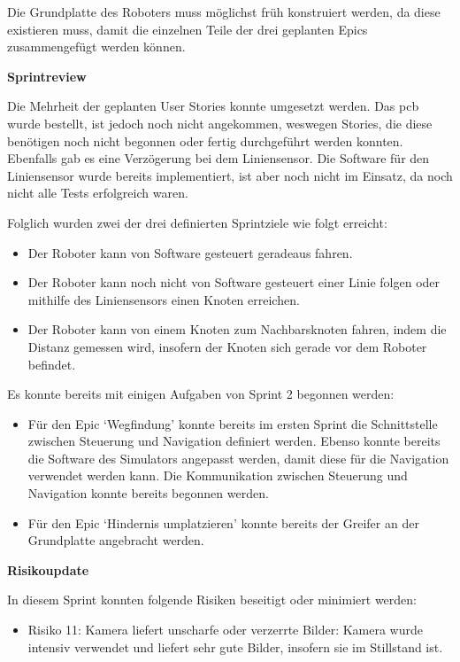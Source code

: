 Die Grundplatte des Roboters muss möglichst früh konstruiert werden, da diese existieren muss, damit die einzelnen Teile der drei geplanten Epics zusammengefügt werden können.


\textbf{Sprintreview}

Die Mehrheit der geplanten User Stories konnte umgesetzt werden.
Das \acrshort{pcb} wurde bestellt, ist jedoch noch nicht angekommen, weswegen Stories, die diese benötigen noch nicht begonnen oder fertig durchgeführt werden konnten.
Ebenfalls gab es eine Verzögerung bei dem Liniensensor. Die Software für den Liniensensor wurde bereits implementiert, ist aber noch nicht im Einsatz, da noch nicht alle Tests erfolgreich waren.

Folglich wurden zwei der drei definierten Sprintziele wie folgt erreicht:
\begin{itemize}
    \item Der Roboter kann von Software gesteuert geradeaus fahren.
    \item Der Roboter kann noch nicht von Software gesteuert einer Linie folgen oder mithilfe des Liniensensors einen Knoten erreichen.
    \item Der Roboter kann von einem Knoten zum Nachbarsknoten fahren, indem die Distanz gemessen wird, insofern der Knoten sich gerade vor dem Roboter befindet.
\end{itemize}


Es konnte bereits mit einigen Aufgaben von Sprint 2 begonnen werden:

\begin{itemize}
    \item Für den Epic `Wegfindung' konnte bereits im ersten Sprint die Schnittstelle zwischen Steuerung und Navigation definiert werden. Ebenso konnte bereits die Software des Simulators angepasst werden, damit diese für die Navigation verwendet werden kann. Die Kommunikation zwischen Steuerung und Navigation konnte bereits begonnen werden.
    \item Für den Epic `Hindernis umplatzieren' konnte bereits der Greifer an der Grundplatte angebracht werden.
\end{itemize}



\textbf{Risikoupdate}
\label{risks-sprint-1}

In diesem Sprint konnten folgende Risiken beseitigt oder minimiert werden:
\begin{itemize}
    \item Risiko 11: Kamera liefert unscharfe oder verzerrte Bilder: Kamera wurde intensiv verwendet und liefert sehr gute Bilder, insofern sie im Stillstand ist.
\end{itemize}


